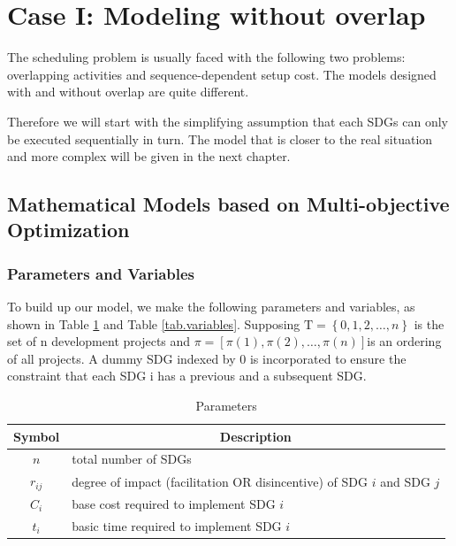 \documentclass[10pt]{mcmthesis}
\begin{document}
\section{Case I: Modeling without overlap}
The scheduling problem is usually faced with the following two problems: overlapping activities and sequence-dependent setup cost. The models designed with and without overlap are quite different\cite{overlap1997}. 

Therefore we will start with the simplifying assumption that each SDGs can only be executed sequentially in turn. The model that is closer to the real situation and more complex will be given in the next chapter.





\subsection{Mathematical Models based on Multi-objective Optimization}%

\subsubsection{Parameters and Variables}

To build up our model, we make the following parameters and variables, as shown in Table \ref{tab.parameters} and Table \ref{tab.variables}.
Supposing $\mathrm{T}=\left\{0, 1, 2, \ldots, n\right\} $
is the set of n development projects and $\pi=[\pi(1), \pi(2), \ldots, \pi(n)]  $is an ordering of all projects. A dummy SDG indexed by 0 is incorporated to ensure the constraint that each SDG i has a previous and a subsequent SDG.

\begin{table}[!h]\caption{Parameters}
\small
\centering
\begin{tabular}{cl}
 \hline
\centering
\label{tab.parameters}
Symbol & \multicolumn{1}{c}{Description}                                                            \\ \hline
$n$     & total number of SDGs                                     \\
$r_{i j}$     & degree of impact (facilitation OR disincentive) of SDG $i$ and SDG $j$ \\
$C_i$    & base cost required to implement SDG $i$                                  \\
$t_i$     & basic time required to implement SDG $i$                                \\ \hline
\end{tabular}
\end{table}
\end{document}
